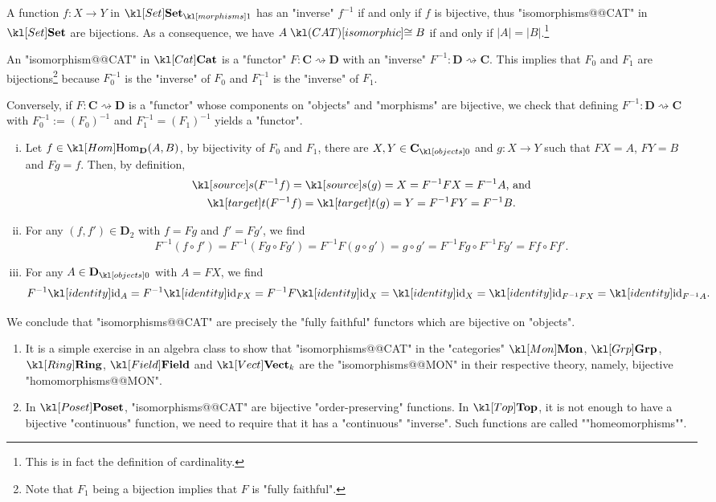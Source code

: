 \documentclass[main.tex]{subfiles}
\begin{document}
\begin{exmp}[$\catSet$]
	A function $f: X \rightarrow Y$ in $\mor{\catSet}$ has an "inverse" $f^{-1}$ if and only if $f$ is bijective, thus "isomorphisms@@CAT" in $\catSet$ are bijections. As a consequence, we have $A \isoCAT B$ if and only if $|A| = |B|$.\footnote{This is in fact the definition of cardinality.}
\end{exmp}
\begin{exmp}[$\catCat$]
	An "isomorphism@@CAT" in $\catCat$ is a "functor" $F:\mathbf{C} \rightsquigarrow \mathbf{D}$ with an "inverse" $F^{-1}: \mathbf{D} \rightsquigarrow \mathbf{C}$. This implies that $F_0$ and $F_1$ are bijections\footnote{Note that $F_1$ being a bijection implies that $F$ is "fully faithful".} because $F_0^{-1}$ is the "inverse" of $F_0$ and $F_1^{-1}$ is the "inverse" of $F_1$.

	Conversely, if $F:\mathbf{C} \rightsquigarrow \mathbf{D}$ is a "functor" whose components on "objects" and "morphisms" are bijective, we check that defining $F^{-1}: \mathbf{D} \rightsquigarrow \mathbf{C}$ with $F_0^{-1} := (F_0)^{-1}$ and $F_1^{-1}= (F_1)^{-1}$ yields a "functor".
	\begin{enumerate}[i.]
		\item Let $f\in \Hom_{\mathbf{D}}(A,B)$, by bijectivity of $F_0$ and $F_1$, there are $X,Y \in \obj{\mathbf{C}}$ and $g:X \rightarrow Y$ such that $FX = A$, $FY = B$ and $Fg = f$. Then, by definition,
		\begin{gather*}
			\source( F^{-1}f ) = \source(g) = X = F^{-1}FX = F^{-1} A\text{, and}\\
			\target( F^{-1}f ) = \target(g) = Y = F^{-1}FY = F^{-1} B.
		\end{gather*}
		\item For any $(f,f') \in \mathbf{D}_2$ with $f = Fg$ and $f' = Fg'$, we find \[F^{-1}(f \circ f') = F^{-1}(Fg \circ Fg') = F^{-1}F(g \circ g') = g \circ g' = F^{-1}Fg \circ F^{-1}Fg' = Ff \circ Ff'.\]
		\item For any $A \in \obj{\mathbf{D}}$ with $A = FX$, we find
		\[F^{-1}\id_A = F^{-1}\id_{FX} = F^{-1}F\id_X = \id_X = \id_{F^{-1}FX} = \id_{F^{-1}A}.\]
	\end{enumerate}
	We conclude that "isomorphisms@@CAT" are precisely the "fully faithful" functors which are bijective on "objects".
\end{exmp}
\begin{exmps}
	\begin{enumerate}
		\item It is a simple exercise in an algebra class to show that "isomorphisms@@CAT" in the "categories" $\catMon$, $\catGrp$, $\catRing$, $\catField$ and $\catVect{k}$ are the "isomorphisms@@MON" in their respective theory, namely, bijective "homomorphisms@@MON".
		\item In $\catPoset$, "isomorphisms@@CAT" are bijective "order-preserving" functions.
		\itemAP In $\catTop$, it is not enough to have a bijective "continuous" function, we need to require that it has a "continuous" "inverse". Such functions are called ""homeomorphisms"". %
	\end{enumerate}
\end{exmps}
\end{document}
